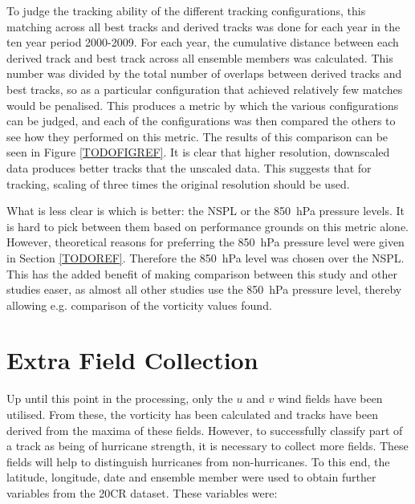\documentclass[pdftex,12pt,a4paper]{report}
\begin{document}
To judge the tracking ability of the different tracking configurations, this matching across all
best tracks and derived tracks was done for each year in the ten year period 2000-2009.  For each
year, the cumulative distance between each derived track and best track across all ensemble members
was calculated. This number was divided by the total number of overlaps between derived tracks and
best tracks, so as a particular configuration that achieved relatively few matches would be
penalised.  This produces a metric by which the various configurations can be judged, and each of
the configurations was then compared the others to see how they performed on this metric. The
results of this comparison can be seen in Figure \ref{TODOFIGREF}. It is clear that higher
resolution, downscaled data produces better tracks that the unscaled data. This suggests that for
tracking, scaling of three times the original resolution should be used. 

What is less clear is which is better: the NSPL or the \SI{850}{hPa} pressure levels. It is hard to
pick between them based on performance grounds on this metric alone. However, theoretical reasons
for preferring the \SI{850}{hPa} pressure level were given in Section \ref{TODOREF}. Therefore the
\SI{850}{hPa} level was chosen over the NSPL. This has the added benefit of making comparison
between this study and other studies easer, as almost all other studies use the \SI{850}{hPa}
pressure level, thereby allowing e.g. comparison of the vorticity values found.


\newpage
\section{Extra Field Collection}
\label{sec:extra_field_collection}

Up until this point in the processing, only the $u$ and $v$ wind fields have been utilised. From
these, the vorticity has been calculated and tracks have been derived from the maxima of these
fields.  However, to successfully classify part of a track as being of hurricane strength, it is
necessary to collect more fields. These fields will help to distinguish hurricanes from
non-hurricanes. To this end, the latitude, longitude, date and ensemble member were used to obtain
further variables from the 20CR dataset. These variables were:
\end{document}
